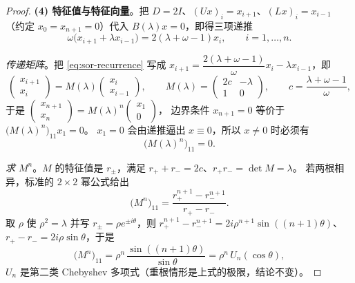 \begin{proof}
\textbf{(4) 特征值与特征向量}。把 $D=2I$、$(Ux)_i=x_{i+1}$、$(Lx)_i=x_{i-1}$
（约定 $x_0=x_{n+1}=0$）代入 $B(\lambda)x=0$，即得三项递推
\begin{equation}
  \omega\bigl(x_{i+1}+\lambda x_{i-1}\bigr)=2(\lambda+\omega-1)x_i,\qquad i=1,\dots,n .
  \label{eq:sor-recurrence}
\end{equation}

\emph{传递矩阵}。把 \eqref{eq:sor-recurrence} 写成
$x_{i+1}=\dfrac{2(\lambda+\omega-1)}{\omega}x_i-\lambda x_{i-1}$，即
\begin{equation}
  \begin{pmatrix}x_{i+1}\\ x_i\end{pmatrix}
  =M(\lambda)\begin{pmatrix}x_i\\ x_{i-1}\end{pmatrix},\qquad
  M(\lambda)=\begin{pmatrix}2c & -\lambda\\ 1 & 0\end{pmatrix},\qquad
  c=\frac{\lambda+\omega-1}{\omega},
\end{equation}
于是 $\begin{pmatrix}x_{n+1}\\ x_n\end{pmatrix}=M(\lambda)^n\begin{pmatrix}x_1\\ 0\end{pmatrix}$，
边界条件 $x_{n+1}=0$ 等价于 $\bigl(M(\lambda)^n\bigr)_{11}x_1=0$。
$x_1=0$ 会由递推逼出 $x\equiv0$，所以 $x\ne0$ 时必须有
\begin{equation}
  \bigl(M(\lambda)^n\bigr)_{11}=0 .
  \label{eq:transfer-condition}
\end{equation}

\emph{求 $M^n$}。$M$ 的特征值是 $r_\pm$，满足 $r_++r_-=2c$、$r_+r_-=\det M=\lambda$。
若两根相异，标准的 $2\times2$ 幂公式给出
\begin{equation}
  \bigl(M^n\bigr)_{11}=\frac{r_+^{n+1}-r_-^{n+1}}{r_+-r_-}.
\end{equation}
取 $\rho$ 使 $\rho^2=\lambda$ 并写 $r_\pm=\rho e^{\pm i\theta}$，则
$r_+^{n+1}-r_-^{n+1}=2i\rho^{n+1}\sin((n+1)\theta)$、$r_+-r_-=2i\rho\sin\theta$，于是
\begin{equation}
  \bigl(M^n\bigr)_{11}=\rho^n\,\frac{\sin((n+1)\theta)}{\sin\theta}
  =\rho^n\,U_n(\cos\theta),
  \label{eq:cheb-transfer}
\end{equation}
$U_n$ 是第二类 Chebyshev 多项式（重根情形是上式的极限，结论不变）。


\end{proof}
